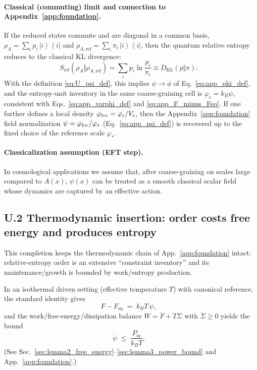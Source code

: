 \documentclass[10pt]{article}
\newcommand{\ket}[1]{\left|#1\right\rangle}
\newcommand{\bra}[1]{\left\langle#1\right|}
\begin{document}
\paragraph{Classical (commuting) limit and connection to Appendix~\ref{app:foundation}.}
If the reduced states commute and are diagonal in a common basis,
$\rho_A=\sum_i p_i\,\ket{i}\!\bra{i}$ and $\rho_{A,\mathrm{ref}}=\sum_i \pi_i\,\ket{i}\!\bra{i}$,
then the quantum relative entropy reduces to the classical KL divergence:
\begin{equation}
S_{\mathrm{rel}}\!\left(\rho_A\Vert\rho_{A,\mathrm{ref}}\right)
=\sum_i p_i\ln\frac{p_i}{\pi_i}
\equiv D_{\mathrm{KL}}(p\Vert\pi).
\label{eq:U_rel_to_KL}
\end{equation}
With the definition \eqref{eq:U_psi_def}, this implies $\psi\to\phi$ of Eq.~\eqref{eq:app_phi_def},
and the entropy-unit inventory in the same coarse-graining cell is $\varphi_c=k_B\psi$, consistent with
Eqs.~\eqref{eq:app_varphi_def} and \eqref{eq:app_F_minus_Feq}. If one further defines a local density
$\varphi_{\rm loc}=\varphi_c/V_c$, then the Appendix~\ref{app:foundation} field normalization
$\psi=\varphi_{\rm loc}/\varphi_\ast$ (Eq.~\eqref{eq:app_psi_def}) is recovered up to the fixed
choice of the reference scale $\varphi_\ast$.

\paragraph{Classicalization assumption (EFT step).}
In cosmological applications we assume that, after coarse-graining on scales large compared to $A(x)$,
$\psi(x)$ can be treated as a smooth classical scalar field whose dynamics are captured by an effective action.

\subsection{U.2 Thermodynamic insertion: order costs free energy and produces entropy}
\label{app:unified:thermo_insertion}

This completion keeps the thermodynamic chain of App.~\ref{app:foundation} intact:
relative-entropy order is an extensive ``constraint inventory'' and its maintenance/growth is bounded by work/entropy production.

In an isothermal driven setting (effective temperature $T$) with canonical reference, the standard identity gives
\begin{equation}
F-F_{\mathrm{eq}} \;=\; k_B T\,\psi,
\label{eq:U_F_identity}
\end{equation}
and the work/free-energy/dissipation balance $\dot W=\dot F+T\dot\Sigma$ with $\dot\Sigma\ge0$ yields the bound
\begin{equation}
\dot\psi \;\le\; \frac{P_{\mathrm{in}}}{k_B T}.
\label{eq:U_psidot_bound}
\end{equation}
(See Sec.~\ref{sec:lemma2_free_energy}--\ref{sec:lemma3_power_bound} and App.~\ref{app:foundation}.)
\end{document}
